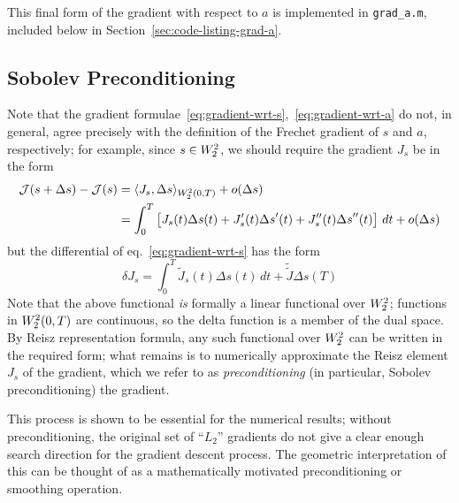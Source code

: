 \documentclass[letterpaper, 10pt, draft]{amsart}
\theoremstyle{definition}
\theoremstyle{remark}
\begin{document}
This final form of the gradient with respect to $a$ is implemented in
\verb+grad_a.m+, included below in Section~\ref{sec:code-listing-grad-a}.

\subsection{Sobolev Preconditioning}
Note that the gradient
formulae~\eqref{eq:gradient-wrt-s},~\eqref{eq:gradient-wrt-a} do not, in
general, agree precisely with the definition of the Frechet gradient of $s$ and
$a$, respectively; for example, since $s \in W_2^2$, we should require
the gradient $J_s$ be in the form
\begin{align*}
  \mathcal{J}(s+{\Delta s}) - \mathcal{J}(s)
  & = \langle J_s, {\Delta s} \rangle_{W_2^2(0,T)}
  + o({\Delta s})
  \\
  & = \int_0^T \left[
    J_s(t) {\Delta s}(t)
    + J_s'(t) {\Delta s}'(t)
    + J_s''(t) {\Delta s}''(t)
    \right]\,dt
    + o({\Delta s})
\end{align*}
but the differential of eq.~\eqref{eq:gradient-wrt-s} has the form
\[
  {\delta J}_s = \int_0^T \tilde{J}_s(t) {\Delta s}(t) \,dt + \tilde{\tilde{J}} {\Delta s}(T)
\]
Note that the above functional \emph{is} formally a linear functional over
$W_2^2{}$; functions in $W_2^2(0,T)$ are continuous, so the
delta function is a member of the dual space.
By Reisz representation formula, any such functional over $W_2^2$ can
be written in the required form; what remains is to numerically approximate the
Reisz element $J_s$ of the gradient, which we refer to as \emph{preconditioning}
(in particular, Sobolev preconditioning) the gradient.

This process is shown to be essential for the numerical results; without
preconditioning, the original set of ``$L_2$'' gradients do not give a clear
enough search direction for the gradient descent process.
The geometric interpretation of this can be thought of as a mathematically motivated
preconditioning or smoothing operation. 
\end{document}

